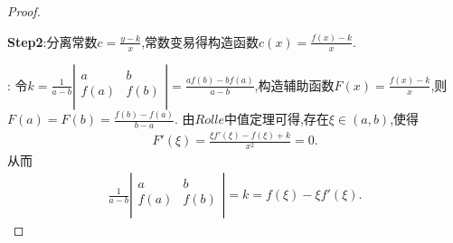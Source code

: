 \documentclass[lang=cn,newtx,10pt,scheme=chinese]{../Template/elegantbook}
\begin{document}
\begin{proof}
\begin{note}
        \textbf{Step2}:分离常数$c=\frac{y-k}{x}$,常数变易得构造函数$c\left( x \right) =\frac{f\left( x \right) -k}{x}$.
    \end{note}
    {\color{blue} }:
    令$k=\frac{1}{a-b}\left| \begin{matrix}
        a&		b\\
        f(a)&		f(b)\\
    \end{matrix} \right|=\frac{af\left( b \right) -bf\left( a \right)}{a-b}$,构造辅助函数$F\left( x \right) =\frac{f\left( x \right) -k}{x}$,则$F\left( a \right) =F\left( b \right) =\frac{f\left( b \right) -f\left( a \right)}{b-a}$.
    由$Rolle$中值定理可得,存在$\xi\in(a,b)$,使得
    \begin{align}
        F'\left( \xi \right) =\frac{\xi f'\left( \xi \right) -f\left( \xi \right) +k}{x^2}=0.
        \nonumber
    \end{align}
    从而
    \begin{align}
        \frac{1}{a-b}\left| \begin{matrix}
            a&		b\\
            f(a)&		f(b)\\
        \end{matrix} \right|=k=f\left( \xi \right) -\xi f'\left( \xi \right) .
        \nonumber
    \end{align}

\end{proof}
\end{document}
